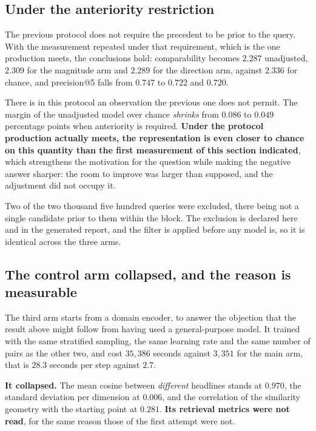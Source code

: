 \subsection{Under the anteriority restriction}

The previous protocol does not require the precedent to be prior to the query. With the
measurement repeated under that requirement, which is the one production meets, the conclusions
hold: comparability becomes $2.287$ unadjusted, $2.309$ for the magnitude arm and $2.289$ for the
direction arm, against $2.336$ for chance, and precision@5 falls from $0.747$ to $0.722$ and
$0.720$.

There is in this protocol an observation the previous one does not permit. The margin of the
unadjusted model over chance \emph{shrinks} from $0.086$ to $0.049$ percentage points when
anteriority is required. \textbf{Under the protocol production actually meets, the representation
is even closer to chance on this quantity than the first measurement of this section
indicated}, which strengthens the motivation for the question while making the negative answer
sharper: the room to improve was larger than supposed, and the adjustment did not occupy it.

Two of the two thousand five hundred queries were excluded, there being not a single candidate
prior to them within the block. The exclusion is declared here and in the generated report, and
the filter is applied before any model is, so it is identical across the three arms.

\subsection{The control arm collapsed, and the reason is measurable}

The third arm starts from a domain encoder, to answer the objection that the result above might
follow from having used a general-purpose model. It trained with the same stratified sampling, the
same learning rate and the same number of pairs as the other two, and cost $35{,}386$ seconds
against $3{,}351$ for the main arm, that is $28.3$ seconds per step against $2.7$.

\textbf{It collapsed.} The mean cosine between \emph{different} headlines stands at $0.970$, the
standard deviation per dimension at $0.006$, and the correlation of the similarity geometry with
the starting point at $0.281$. \textbf{Its retrieval metrics were not read}, for the same reason
those of the first attempt were not.

